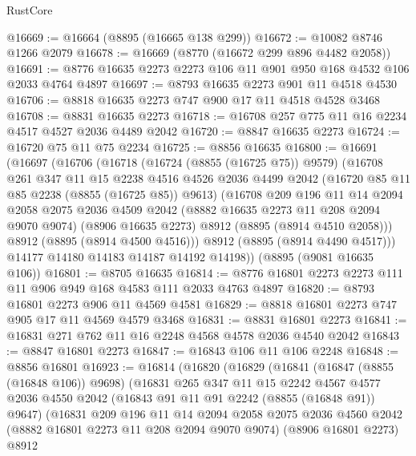 \begin{lexlean}{RustCore}
\begin{coremodule}
@16669 := @16664 (@8895 (@16665 @138 @299))
@16672 := @10082 @8746 @1266 @2079
@16678 := @16669 (@8770 (@16672 @299 @896 @4482 @2058))
@16691 := @8776 @16635 @2273 @2273 @106 @11 @901 @950 @168 @4532 @106 @2033 @4764 @4897
@16697 := @8793 @16635 @2273 @901 @11 @4518 @4530
@16706 := @8818 @16635 @2273 @747 @900 @17 @11 @4518 @4528 @3468
@16708 := @8831 @16635 @2273
@16718 := @16708 @257 @775 @11 @16 @2234 @4517 @4527 @2036 @4489 @2042
@16720 := @8847 @16635 @2273
@16724 := @16720 @75 @11 @75 @2234
@16725 := @8856 @16635
@16800 := @16691
    (@16697
      (@16706
        (@16718
          (@16724 (@8855 (@16725 @75)) @9579)
          (@16708
            @261
            @347
            @11
            @15
            @2238
            @4516
            @4526
            @2036
            @4499
            @2042
            (@16720 @85 @11 @85 @2238 (@8855 (@16725 @85)) @9613)
            (@16708
              @209
              @196
              @11
              @14
              @2094
              @2058
              @2075
              @2036
              @4509
              @2042
              (@8882 @16635 @2273 @11 @208 @2094 @9070 @9074)
              (@8906 @16635 @2273)
              @8912
              (@8895 (@8914 @4510 @2058)))
            @8912
            (@8895 (@8914 @4500 @4516)))
          @8912
          (@8895 (@8914 @4490 @4517)))
        @14177
        @14180
        @14183
        @14187
        @14192
        @14198))
    (@8895 (@9081 @16635 @106))
@16801 := @8705 @16635
@16814 := @8776 @16801 @2273 @2273 @111 @11 @906 @949 @168 @4583 @111 @2033 @4763 @4897
@16820 := @8793 @16801 @2273 @906 @11 @4569 @4581
@16829 := @8818 @16801 @2273 @747 @905 @17 @11 @4569 @4579 @3468
@16831 := @8831 @16801 @2273
@16841 := @16831 @271 @762 @11 @16 @2248 @4568 @4578 @2036 @4540 @2042
@16843 := @8847 @16801 @2273
@16847 := @16843 @106 @11 @106 @2248
@16848 := @8856 @16801
@16923 := @16814
    (@16820
      (@16829
        (@16841
          (@16847 (@8855 (@16848 @106)) @9698)
          (@16831
            @265
            @347
            @11
            @15
            @2242
            @4567
            @4577
            @2036
            @4550
            @2042
            (@16843 @91 @11 @91 @2242 (@8855 (@16848 @91)) @9647)
            (@16831
              @209
              @196
              @11
              @14
              @2094
              @2058
              @2075
              @2036
              @4560
              @2042
              (@8882 @16801 @2273 @11 @208 @2094 @9070 @9074)
              (@8906 @16801 @2273)
              @8912

\end{coremodule}
\end{lexlean}
